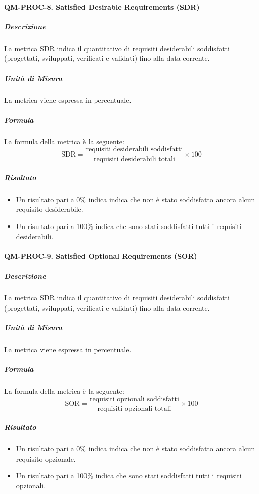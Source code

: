 		\paragraph{QM-PROC-8. Satisfied Desirable Requirements (SDR)}

			\subparagraph{Descrizione}
			La metrica SDR indica il quantitativo di requisiti desiderabili soddisfatti (progettati, sviluppati, verificati e validati) fino alla data corrente.

			\subparagraph{Unità di Misura}
			La metrica viene espressa in percentuale.

			\subparagraph{Formula}
			La formula della metrica è la seguente:
			\[
				\text{SDR} = \frac{\text{requisiti desiderabili soddisfatti}}{\text{requisiti desiderabili totali}} \times 100
			\]

			\subparagraph{Risultato}
			\begin{itemize}
				\item Un risultato pari a 0\% indica indica che non è stato soddisfatto ancora alcun requisito desiderabile.
				\item Un risultato pari a 100\% indica che sono stati soddisfatti tutti i requisiti desiderabili.
			\end{itemize}

		\paragraph{QM-PROC-9. Satisfied Optional Requirements (SOR)}

			\subparagraph{Descrizione}
			La metrica SDR indica il quantitativo di requisiti desiderabili soddisfatti (progettati, sviluppati, verificati e validati) fino alla data corrente.

			\subparagraph{Unità di Misura}
			La metrica viene espressa in percentuale.

			\subparagraph{Formula}
			La formula della metrica è la seguente:
			\[
				\text{SOR} = \frac{\text{requisiti opzionali soddisfatti}}{\text{requisiti opzionali totali}} \times 100
			\]

			\subparagraph{Risultato}
			\begin{itemize}
				\item Un risultato pari a 0\% indica indica che non è stato soddisfatto ancora alcun requisito opzionale.
				\item Un risultato pari a 100\% indica che sono stati soddisfatti tutti i requisiti opzionali.
			\end{itemize}

